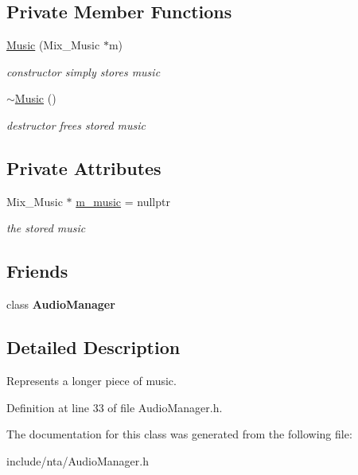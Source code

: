 \subsection*{Private Member Functions}
\begin{DoxyCompactItemize}
\item 
\mbox{\label{classnta_1_1Music_aa38f19729b8afd2591d236dde3c65edd}} 
\hyperlink{classnta_1_1Music_aa38f19729b8afd2591d236dde3c65edd}{Music} (Mix\+\_\+\+Music $\ast$m)
\begin{DoxyCompactList}\small\item\em constructor simply stores music \end{DoxyCompactList}\item 
\mbox{\label{classnta_1_1Music_a5cb0a3bbc5222752b0cbc9a90468e98b}} 
\hyperlink{classnta_1_1Music_a5cb0a3bbc5222752b0cbc9a90468e98b}{$\sim$\+Music} ()
\begin{DoxyCompactList}\small\item\em destructor frees stored music \end{DoxyCompactList}\end{DoxyCompactItemize}
\subsection*{Private Attributes}
\begin{DoxyCompactItemize}
\item 
\mbox{\label{classnta_1_1Music_a8a39359bb2dc8d8d350119ee47a7c3a0}} 
Mix\+\_\+\+Music $\ast$ \hyperlink{classnta_1_1Music_a8a39359bb2dc8d8d350119ee47a7c3a0}{m\+\_\+music} = nullptr
\begin{DoxyCompactList}\small\item\em the stored music \end{DoxyCompactList}\end{DoxyCompactItemize}
\subsection*{Friends}
\begin{DoxyCompactItemize}
\item 
\mbox{\label{classnta_1_1Music_a85edaa7e5c3ae68dabadd5373890591e}} 
class {\bfseries Audio\+Manager}
\end{DoxyCompactItemize}


\subsection{Detailed Description}
Represents a longer piece of music. 

Definition at line 33 of file Audio\+Manager.\+h.



The documentation for this class was generated from the following file\+:\begin{DoxyCompactItemize}
\item 
include/nta/Audio\+Manager.\+h\end{DoxyCompactItemize}
